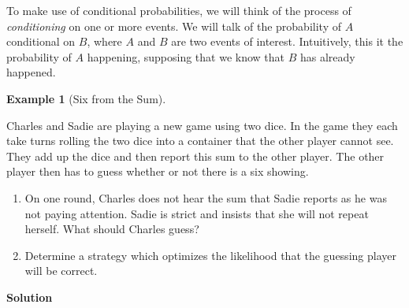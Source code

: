 \documentclass[
  letterpaper,
  DIV=11,
  numbers=noendperiod]{scrreprt}
\providecommand{\tightlist}{%
  \setlength{\itemsep}{0pt}\setlength{\parskip}{0pt}}\usepackage{longtable,booktabs,array}
\theoremstyle{definition}
\theoremstyle{definition}
\theoremstyle{definition}
\newtheorem{example}{Example}[chapter]
\theoremstyle{remark}
\begin{document}
To make use of conditional probabilities, we will think of the process
of \emph{conditioning} on one or more events. We will talk of the
probability of \(A\) conditional on \(B\), where \(A\) and \(B\) are two
events of interest. Intuitively, this it the probability of \(A\)
happening, supposing that we know that \(B\) has already happened.

\begin{example}[Six from the
Sum]\protect\hypertarget{exm-basic-conditional-probability}{}\label{exm-basic-conditional-probability}

Charles and Sadie are playing a new game using two dice. In the game
they each take turns rolling the two dice into a container that the
other player cannot see. They add up the dice and then report this sum
to the other player. The other player then has to guess whether or not
there is a six showing.

\begin{enumerate}
\def\labelenumi{\alph{enumi}.}
\tightlist
\item
  On one round, Charles does not hear the sum that Sadie reports as he
  was not paying attention. Sadie is strict and insists that she will
  not repeat herself. What should Charles guess?
\item
  Determine a strategy which optimizes the likelihood that the guessing
  player will be correct.
\end{enumerate}

\begin{tcolorbox}[enhanced jigsaw, colback=white, breakable, rightrule=.15mm, leftrule=.75mm, toprule=.15mm, left=2mm, arc=.35mm, opacityback=0, bottomrule=.15mm]

\vspace{-3mm}\textbf{Solution}\vspace{3mm}


\end{tcolorbox}
\end{example}
\end{document}
